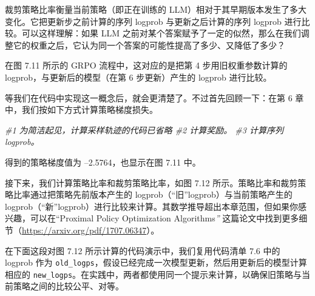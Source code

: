裁剪策略比率衡量当前策略（即正在训练的 LLM）相对于其早期版本发生了多大变化。它把更新步之前计算的序列 logprob 与更新之后计算的序列 logprob 进行比较。可以这样理解：如果 LLM 之前对某个答案赋予了一定的似然，那么在我们调整它的权重之后，它认为同一个答案的可能性提高了多少、又降低了多少？

在图 7.11 所示的 GRPO 流程中，这对应的是把第 4 步用旧权重参数计算的 logprob，与更新后的模型（在第 6 步更新）产生的 logprob 进行比较。


等我们在代码中实现这一概念后，就会更清楚了。不过首先回顾一下：在第 6 章中，我们按如下方式计算策略梯度损失。

{\noindent\small\textit{\#1 为简洁起见，计算采样轨迹的代码已省略 \newline \#2 计算奖励。 \newline \#3 计算序列 logprob。}\par}

得到的策略梯度值为 –2.5764，也显示在图 7.11 中。

接下来，我们计算策略比率和裁剪策略比率，如图 7.12 所示。策略比率和裁剪策略比率通过把策略先前版本产生的 logprob（“旧”logprob）与当前策略产生的 logprob（“新”logprob）进行比较来计算。其数学推导超出本章范围，但如果你感兴趣，可以在“Proximal Policy Optimization Algorithms\emph{”} 这篇论文中找到更多细节（\href{https://arxiv.org/pdf/1707.06347}{https://arxiv.org/pdf/1707.06347}）。


在下面这段对图 7.12 所示计算的代码演示中，我们复用代码清单 7.6 中的 logprob 作为 \texttt{old\_logps}，假设已经完成一次模型更新，然后用更新后的模型计算相应的 \texttt{new\_logps}。在实践中，两者都使用同一个提示来计算，以确保旧策略与当前策略之间的比较公平、对等。

